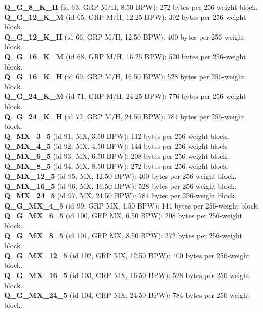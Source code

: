 \noindent\textbf{Q\_G\_8\_K\_H} (id 63, GRP M/H, 8.50 BPW): 272 bytes per 256-weight block. \\
\noindent\textbf{Q\_G\_12\_K\_M} (id 65, GRP M/H, 12.25 BPW): 392 bytes per 256-weight block. \\
\noindent\textbf{Q\_G\_12\_K\_H} (id 66, GRP M/H, 12.50 BPW): 400 bytes per 256-weight block. \\
\noindent\textbf{Q\_G\_16\_K\_M} (id 68, GRP M/H, 16.25 BPW): 520 bytes per 256-weight block. \\
\noindent\textbf{Q\_G\_16\_K\_H} (id 69, GRP M/H, 16.50 BPW): 528 bytes per 256-weight block. \\
\noindent\textbf{Q\_G\_24\_K\_M} (id 71, GRP M/H, 24.25 BPW): 776 bytes per 256-weight block. \\
\noindent\textbf{Q\_G\_24\_K\_H} (id 72, GRP M/H, 24.50 BPW): 784 bytes per 256-weight block. \\
\noindent\textbf{Q\_MX\_3\_5} (id 91, MX, 3.50 BPW): 112 bytes per 256-weight block. \\
\noindent\textbf{Q\_MX\_4\_5} (id 92, MX, 4.50 BPW): 144 bytes per 256-weight block. \\
\noindent\textbf{Q\_MX\_6\_5} (id 93, MX, 6.50 BPW): 208 bytes per 256-weight block. \\
\noindent\textbf{Q\_MX\_8\_5} (id 94, MX, 8.50 BPW): 272 bytes per 256-weight block. \\
\noindent\textbf{Q\_MX\_12\_5} (id 95, MX, 12.50 BPW): 400 bytes per 256-weight block. \\
\noindent\textbf{Q\_MX\_16\_5} (id 96, MX, 16.50 BPW): 528 bytes per 256-weight block. \\
\noindent\textbf{Q\_MX\_24\_5} (id 97, MX, 24.50 BPW): 784 bytes per 256-weight block. \\
\noindent\textbf{Q\_G\_MX\_4\_5} (id 99, GRP MX, 4.50 BPW): 144 bytes per 256-weight block. \\
\noindent\textbf{Q\_G\_MX\_6\_5} (id 100, GRP MX, 6.50 BPW): 208 bytes per 256-weight block. \\
\noindent\textbf{Q\_G\_MX\_8\_5} (id 101, GRP MX, 8.50 BPW): 272 bytes per 256-weight block. \\
\noindent\textbf{Q\_G\_MX\_12\_5} (id 102, GRP MX, 12.50 BPW): 400 bytes per 256-weight block. \\
\noindent\textbf{Q\_G\_MX\_16\_5} (id 103, GRP MX, 16.50 BPW): 528 bytes per 256-weight block. \\
\noindent\textbf{Q\_G\_MX\_24\_5} (id 104, GRP MX, 24.50 BPW): 784 bytes per 256-weight block. \\

